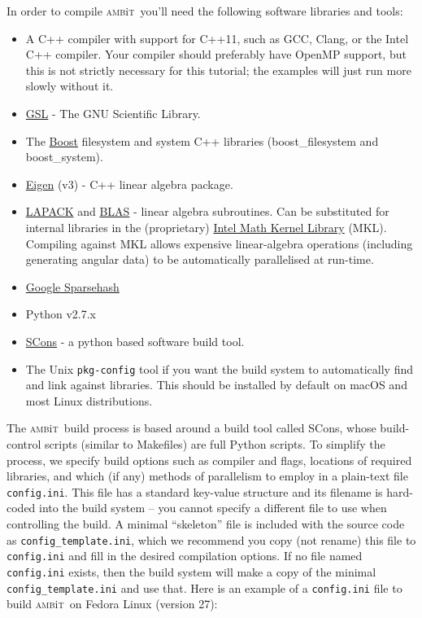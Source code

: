 \documentclass{report}
\newcommand{\ambit}{\textsc{amb}{\footnotesize i}\textsc{t}}
\begin{document}
In order to compile \ambit\  you'll need the following software libraries and tools:
\begin{itemize}
\item A C++ compiler with support for C++11, such as GCC, Clang, or the Intel C++ compiler. Your 
compiler should preferably have OpenMP support, but this is not strictly necessary for this tutorial;
the examples will just run more slowly without it.
\item \href{https://www.gnu.org/software/gsl/}{GSL} - The GNU Scientific Library. 
\item The \href{https://www.boost.org/}{Boost} filesystem and system C++ libraries (boost\_filesystem 
and boost\_system).
\item \href{http://eigen.tuxfamily.org/index.php?title=Main_Page}{Eigen} (v3) - C++ linear algebra 
package.
\item \href{http://www.netlib.org/lapack/}{LAPACK} and \href{http://www.netlib.org/blas/}{BLAS} - 
linear algebra subroutines. Can be substituted for internal libraries in the (proprietary)
\href{https://software.intel.com/en-us/mkl}{Intel Math Kernel Library} (MKL). Compiling against MKL
allows expensive linear-algebra operations (including generating angular data) to be automatically
parallelised at run-time.
\item \href{https://github.com/sparsehash/sparsehash}{Google Sparsehash}
\item Python v2.7.x
\item \href{http://scons.org/}{SCons} - a python based software build tool.
\item The Unix \texttt{pkg-config} tool if you want the build system to automatically find and link
against libraries. This should be installed by default on macOS and most Linux distributions.
\end{itemize}

The \ambit\  build process is based around a build tool called SCons, whose build-control scripts 
(similar to Makefiles) are full Python scripts. To simplify the process, we specify build options such 
as compiler and flags, locations of required libraries, and which (if any) methods of parallelism to 
employ in a plain-text file \texttt{config.ini}. This file has a standard key-value structure and its 
filename is hard-coded into the build system -- you cannot specify a different file to use when 
controlling the build. A minimal ``skeleton'' file is included with the source code as 
\texttt{config\_template.ini}, which we recommend you copy (not rename) this file to \texttt{config.ini}
and fill in the desired compilation options. If no file named \texttt{config.ini} exists, then the build
system will make a copy of the minimal \texttt{config\_template.ini} and use that. Here is an example of
a \texttt{config.ini} file to build \ambit\  on Fedora Linux (version 27):
\end{document}
